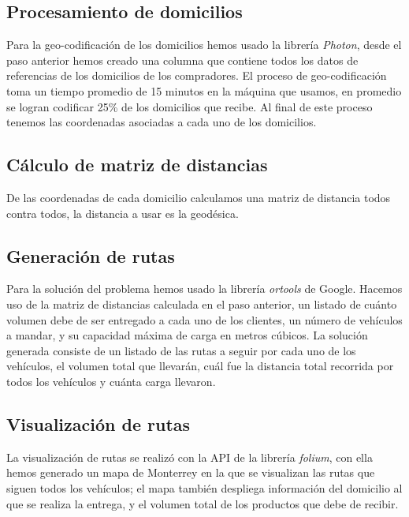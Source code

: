 \documentclass[journal]{IEEEtran}
\begin{document}
        \subsection{Procesamiento de domicilios} \label{stage 2}
        
            Para la geo-codificación de los domicilios hemos usado la librería \emph{Photon}, desde el paso anterior hemos creado una columna que contiene todos los datos de referencias de los domicilios de los compradores. El proceso de geo-codificación toma un tiempo promedio de 15 minutos en la máquina que usamos, en promedio se logran codificar 25\% de los domicilios que recibe. Al final de este proceso tenemos las coordenadas asociadas a cada uno de los domicilios.

        \subsection{Cálculo de matriz de distancias} \label{stage 3}
            
            De las coordenadas de cada domicilio calculamos una matriz de distancia todos contra todos, la distancia a usar es la geodésica.

        \subsection{Generación de rutas} \label{stage 4}
        
            Para la solución del problema hemos usado la librería \emph{ortools} de Google. Hacemos uso de la matriz de distancias calculada en el paso anterior, un listado de cuánto volumen debe de ser entregado a cada uno de los clientes, un número de vehículos a mandar, y su capacidad máxima de carga en metros cúbicos. La solución generada consiste de un listado de las rutas a seguir por cada uno de los vehículos, el volumen total que llevarán, cuál fue la distancia total recorrida por todos los vehículos y cuánta carga llevaron.

        \subsection{Visualización de rutas} 
            
            La visualización de rutas se realizó con la API de la librería \emph{folium}, con ella hemos generado un mapa de Monterrey en la que se visualizan las rutas que siguen todos los vehículos; el mapa también despliega información del domicilio al que se realiza la entrega, y el volumen total de los productos que debe de recibir.
        
\end{document}

